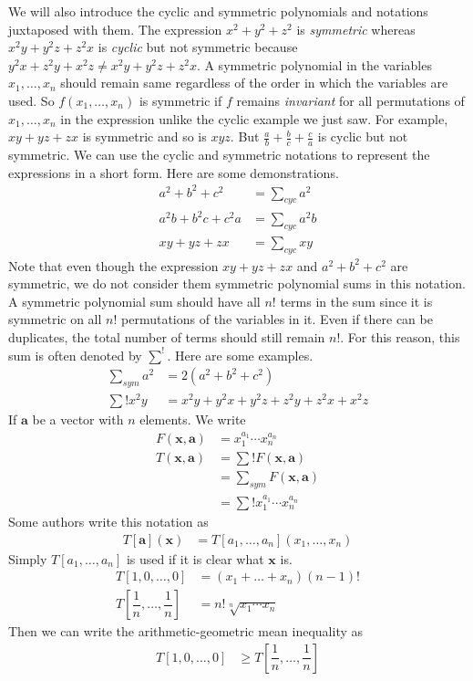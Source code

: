 \documentclass{subfile}
\begin{document}
	We will also introduce the cyclic and symmetric polynomials and notations juxtaposed with them. The expression $x^{2}+y^{2}+z^{2}$ is \textit{symmetric} whereas $x^{2}y+y^{2}z+z^{2}x$ is \textit{cyclic} but not symmetric because $y^{2}x+z^{2}y+x^{2}z\neq x^{2}y+y^{2}z+z^{2}x$. A symmetric polynomial in the variables $x_{1},\ldots,x_{n}$ should remain same regardless of the order in which the variables are used. So $f(x_{1},\ldots,x_{n})$ is symmetric if $f$ remains \textit{invariant} for all permutations of $x_{1},\ldots,x_{n}$ in the expression unlike the cyclic example we just saw. For example, $xy+yz+zx$ is symmetric and so is $xyz$. But $\frac{a}{b}+\frac{b}{c}+\frac{c}{a}$ is cyclic but not symmetric. We can use the cyclic and symmetric notations to represent the expressions in a short form. Here are some demonstrations.
		\begin{align*}
			a^{2}+b^{2}+c^{2}
				& = \sum_{cyc}a^{2}\\
			a^{2}b+b^{2}c+c^{2}a
				& = \sum_{cyc}a^{2}b\\
			xy+yz+zx
				& = \sum_{cyc}xy
		\end{align*}
	Note that even though the expression $xy+yz+zx$ and $a^{2}+b^{2}+c^{2}$ are symmetric, we do not consider them symmetric polynomial sums in this notation. A symmetric polynomial sum should have all $n!$ terms in the sum since it is symmetric on all $n!$ permutations of the variables in it. Even if there can be duplicates, the total number of terms should still remain $n!$. For this reason, this sum is often denoted by $\sum^{!}$. Here are some examples.
		\begin{align*}
			\sum_{sym}a^{2}
				& = 2(a^{2}+b^{2}+c^{2})\\
			\sum{!} x^{2}y
				& = x^{2}y+y^{2}x+y^{2}z+z^{2}y+z^{2}x+x^{2}z
		\end{align*}
	If $\mathbf{a}$ be a vector with $n$ elements. We write
		\begin{align*}
			F(\mathbf{x}, \mathbf{a})
				& = x_{1}^{a_{1}}\cdots x_{n}^{a_{n}}\\
			T(\mathbf{x},\mathbf{a})
				& = \sum{!}F(\mathbf{x},\mathbf{a})\\
				& = \sum_{sym} F(\mathbf{x},\mathbf{a})\\
				& = \sum{!}x_{1}^{a_{1}}\cdots x_{n}^{a_{n}}
		\end{align*}
	Some authors write this notation as
		\begin{align*}
			T[\mathbf{a}](\mathbf{x})
				& = T[a_{1},\ldots,a_{n}](x_{1},\ldots,x_{n})
		\end{align*}
	Simply $T[a_{1},\ldots,a_{n}]$ is used if it is clear what $\mathbf{x}$ is.
		\begin{align*}
			T[1,0,\ldots,0]
				& = (x_{1}+\ldots+x_{n})(n-1)!\\
			T\left[\dfrac{1}{n},\ldots,\dfrac{1}{n}\right]
				& = n!\sqrt[n]{x_{1}\cdots x_{n}}
		\end{align*}
	Then we can write the arithmetic-geometric mean inequality as
		\begin{align*}
			T[1,0,\ldots,0]
				& \geq T\left[\dfrac{1}{n},\ldots,\dfrac{1}{n}\right]
		\end{align*}
\end{document}
